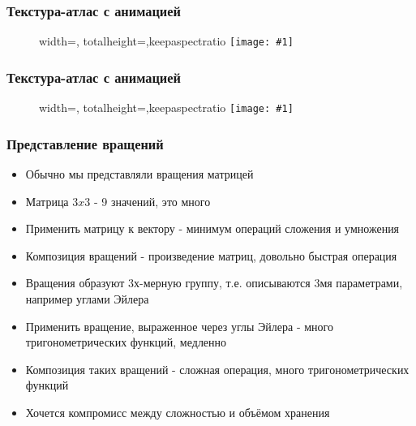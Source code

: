 \documentclass{beamer}
\newcommand{\slideimage}[1]{
  \begin{figure}
    \begin{adjustbox}{width=\textwidth, totalheight=\textheight-2\baselineskip-2\baselineskip,keepaspectratio}
      \texttt{[image: \#1]}
    \end{adjustbox}
  \end{figure}
}
\begin{document}
\begin{frame}[fragile]
\frametitle{Текстура-атлас с анимацией}
\slideimage{atlas1.jpg}
\end{frame}

\begin{frame}[fragile]
\frametitle{Текстура-атлас с анимацией}
\slideimage{atlas2.jpg}
\end{frame}

\begin{frame}[fragile]
\frametitle{Представление вращений}
\begin{itemize}
\item Обычно мы представляли вращения матрицей
\item Матрица \begin{math}3x3\end{math} - 9 значений, это много
\item Применить матрицу к вектору - минимум операций сложения и умножения
\item Композиция вращений - произведение матриц, довольно быстрая операция
\pause
\item Вращения образуют 3х-мерную группу, т.е. описываются 3мя параметрами, например углами Эйлера
\item Применить вращение, выраженное через углы Эйлера - много тригонометрических функций, медленно
\item Композиция таких вращений - сложная операция, много тригонометрических функций
\pause
\item Хочется компромисс между сложностью и объёмом хранения
\end{itemize}
\end{frame}
\end{document}
